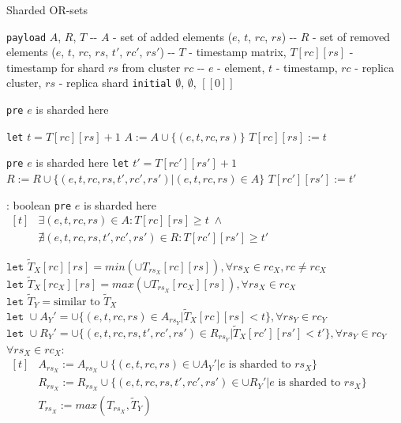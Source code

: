 \begin{algorithm}
  \small
  \caption{Sharded OR-sets}
  \begin{algorithmic}[0]
    \State \texttt{payload} $A$, $R$, $T$
    \State -{}- $A$ - set of added elements ($e$, $t$, $rc$, $rs$)
    \State -{}- $R$ - set of removed elements ($e$, $t$, $rc$, $rs$, $t'$, $rc'$, $rs'$)
    \State -{}- $T$ - timestamp matrix, $T[rc][rs]$ - timestamp for shard $rs$ from cluster $rc$
    \State -{}- $e$ - element, $t$ - timestamp, $rc$ - replica cluster, $rs$ - replica shard
    \State \texttt{initial} $\emptyset$, $\emptyset$, $[[0]]$
    
    \Statex

      \State \texttt{pre} $e$ is sharded here

      \State \texttt{let} $t = T[rc][rs] + 1$
      \State $A := A \cup \{(e, t, rc, rs)\}$
      \State $T[rc][rs] := t$
    \EndProcedure

      \State \texttt{pre} $e$ is sharded here
      \State \texttt{let} $t' = T[rc'][rs'] + 1$
      \State $R := R \cup \{(e, t, rc, rs, t', rc', rs') | (e, t, rc, rs) \in A\}$
      \State $T[rc'][rs'] := t'$
    \EndProcedure
    
     : boolean
      \State \texttt{pre} $e$ is sharded here
      \State \Return $\begin{aligned}[t]
                        & \exists (e, t, rc, rs) \in A : T[rc][rs] \geq t \; \land \\
                        & \nexists (e, t, rc, rs, t', rc', rs') \in R : T[rc'][rs'] \geq t'
                      \end{aligned}$
    \EndFunction
    
      \State $\texttt{let } \tilde{T}_{X}[rc][rs] = min (\cup T_{rs_{X}}[rc][rs]), \forall rs_{X} \in rc_{X}, rc \neq rc_{X}$
      \State $\texttt{let } \tilde{T}_{X}[rc_{X}][rs] = max (\cup T_{rs_{X}}[rc_{X}][rs]), \forall rs_{X} \in rc_{X}$
      \State $\texttt{let } \tilde{T}_{Y} = \text{similar to } \tilde{T}_{X}$
      \State $\texttt{let } \cup A_{Y}' = \cup \{ (e, t, rc, rs) \in A_{rs_{Y}} | \tilde{T}_{X}[rc][rs] < t \}, \forall rs_{Y} \in rc_{Y}$
      \State $\texttt{let } \cup R_{Y}' = \cup \{ (e, t, rc, rs, t', rc', rs') \in R_{rs_{Y}} | \tilde{T}_{X}[rc'][rs'] < t' \}, \forall rs_{Y} \in rc_{Y}$
      \State $\forall rs_{X} \in rc_{X}$:
      \State\hspace{\algorithmicindent}
             $\begin{aligned}[t]
                & A_{rs_{X}} := A_{rs_{X}} \cup \{ (e, t, rc, rs) \in \cup A_{Y}' | e \text{ is sharded to } rs_{X} \} \\
                & R_{rs_{X}} := R_{rs_{X}} \cup \{ (e, t, rc, rs, t', rc', rs') \in \cup R_{Y}' | e \text{ is sharded to } rs_{X} \} \\
                & T_{rs_{X}} := max(T_{rs_{X}}, \tilde{T}_{Y})
              \end{aligned}$
    \EndProcedure

  \end{algorithmic}
\end{algorithm}

